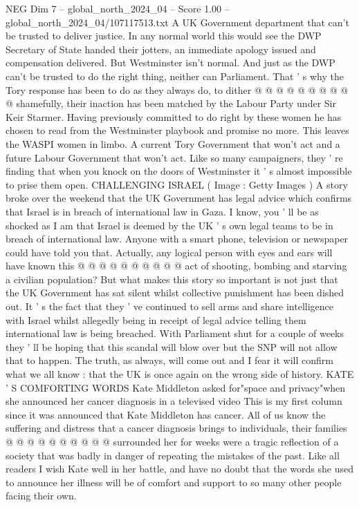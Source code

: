\begin{textsample}{NEG Dim 7 – global\_north\_2024\_04 – Score 1.00 – global\_north\_2024\_04/107117513.txt}
A UK Government department that can't be trusted to deliver justice.
In any normal world this would see the DWP Secretary of State handed their jotters, an immediate apology issued and compensation delivered.
But Westminster isn't normal.
And just as the DWP can't be trusted to do the right thing, neither can Parliament.
That ' s why the Tory response has been to do as they always do, to dither @ @ @ @ @ @ @ @ @ @ shamefully, their inaction has been matched by the Labour Party under Sir Keir Starmer.
Having previously committed to do right by these women he has chosen to read from the Westminster playbook and promise no more.
This leaves the WASPI women in limbo.
A current Tory Government that won't act and a future Labour Government that won't act.
Like so many campaigners, they ' re finding that when you knock on the doors of Westminster it ' s almost impossible to prise them open.
CHALLENGING ISRAEL ( Image : Getty Images ) A story broke over the weekend that the UK Government has legal advice which confirms that Israel is in breach of international law in Gaza.
I know, you ' ll be as shocked as I am that Israel is deemed by the UK ' s own legal teams to be in breach of international law.
Anyone with a smart phone, television or newspaper could have told you that.
Actually, any logical person with eyes and ears will have known this @ @ @ @ @ @ @ @ @ @ act of shooting, bombing and starving a civilian population?
But what makes this story so important is not just that the UK Government has sat silent whilst collective punishment has been dished out.
It ' s the fact that they ' ve continued to sell arms and share intelligence with Israel whilst allegedly being in receipt of legal advice telling them international law is being breached.
With Parliament shut for a couple of weeks they ' ll be hoping that this scandal will blow over but the SNP will not allow that to happen.
The truth, as always, will come out and I fear it will confirm what we all know : that the UK is once again on the wrong side of history.
KATE ' S COMFORTING WORDS Kate Middleton asked for"space and privacy"when she announced her cancer diagnosis in a televised video This is my first column since it was announced that Kate Middleton has cancer.
All of us know the suffering and distress that a cancer diagnosis brings to individuals, their families @ @ @ @ @ @ @ @ @ @ surrounded her for weeks were a tragic reflection of a society that was badly in danger of repeating the mistakes of the past.
Like all readers I wish Kate well in her battle, and have no doubt that the words she used to announce her illness will be of comfort and support to so many other people facing their own.

\end{textsample}
